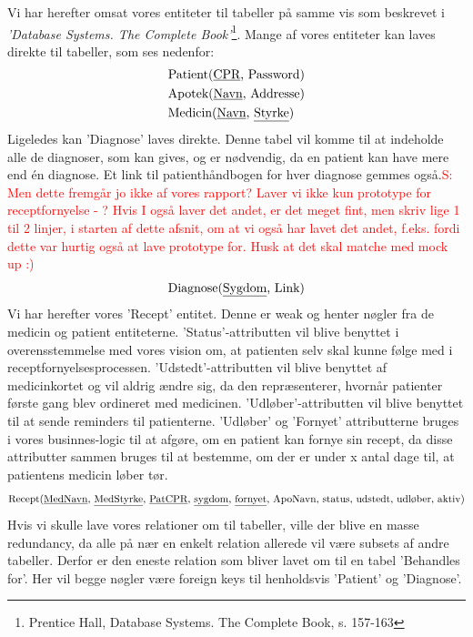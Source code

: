 Vi har herefter omsat vores entiteter til tabeller på samme vis som beskrevet i \textit{'Database Systems. The Complete Book'}\footnote{Prentice Hall, Database Systems. The Complete Book, s. 157-163}. Mange af vores entiteter kan laves direkte til tabeller, som ses nedenfor:
\begin{align*}
	&\textrm{Patient}(\textrm{\underline{CPR}, Password})\\
	&\textrm{Apotek}(\textrm{\underline{Navn}, Addresse})\\
	&\textrm{Medicin}(\textrm{\underline{Navn}, \underline{Styrke}})\\
\end{align*}
Ligeledes kan 'Diagnose' laves direkte. Denne tabel vil komme til at indeholde alle de diagnoser, som kan gives, og er nødvendig, da en patient kan have mere end én diagnose. Et link til patienthåndbogen for hver diagnose gemmes også.\textcolor{red}{S: Men dette fremgår jo ikke af vores rapport? Laver vi ikke kun prototype for receptfornyelse - ? Hvis I også laver det andet, er det meget fint, men skriv lige 1 til 2 linjer, i starten af dette afsnit, om at vi også har lavet det andet, f.eks. fordi dette var hurtig også at lave prototype for. Husk at det skal matche med mock up :)}
\begin{equation*}
\textrm{Diagnose}(\textrm{\underline{Sygdom}, Link})
\end{equation*}
Vi har herefter vores 'Recept' entitet. Denne er weak og henter nøgler fra de medicin og patient entiteterne. 'Status'-attributten vil blive benyttet i overensstemmelse med vores vision om, at patienten selv skal kunne følge med i receptfornyelsesprocessen. 'Udstedt'-attributten vil blive benyttet af medicinkortet og vil aldrig ændre sig, da den repræsenterer, hvornår patienter første gang blev ordineret med medicinen. 'Udløber'-attributten vil blive benyttet til at sende reminders til patienterne. 'Udløber' og 'Fornyet' attributterne bruges i vores businnes-logic til at afgøre, om en patient kan fornye sin recept, da disse attributter sammen bruges til at bestemme, om der er under x antal dage til, at patientens medicin løber tør. 
\begin{equation*}
	\textrm{Recept}(\textrm{\underline{MedNavn}, \underline{MedStyrke}, \underline{PatCPR}, \underline{sygdom}, \underline{fornyet}, ApoNavn, status, udstedt, udløber, aktiv})
\end{equation*}
Hvis vi skulle lave vores relationer om til tabeller, ville der blive en masse redundancy, da alle på nær en enkelt relation allerede vil være subsets af andre tabeller. Derfor er den eneste relation som bliver lavet om til en tabel 'Behandles for'. Her vil begge nøgler være foreign keys til henholdsvis 'Patient' og 'Diagnose'.
